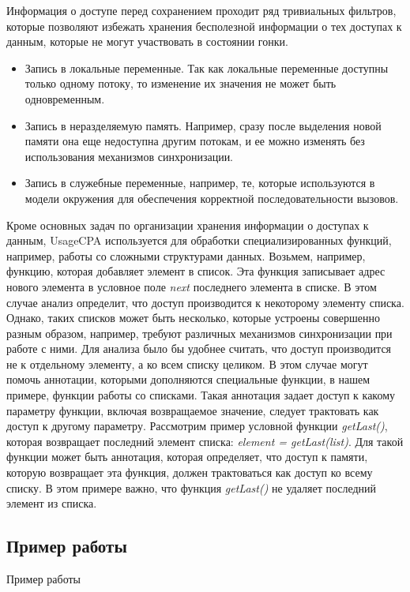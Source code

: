 Информация о доступе перед сохранением проходит ряд тривиальных фильтров, которые позволяют избежать хранения бесполезной информации о тех доступах к данным, которые не могут участвовать в состоянии гонки.

\begin{itemize}
\item Запись в локальные переменные. Так как локальные переменные доступны только одному потоку, то изменение их значения не может быть одновременным.
\item Запись в неразделяемую память. Например, сразу после выделения новой памяти она еще недоступна другим потокам, и ее можно изменять без использования механизмов синхронизации.
\item Запись в служебные переменные, например, те, которые используются в модели окружения для обеспечения корректной последовательности вызовов. 
\end{itemize}

Кроме основных задач по организации хранения информации о доступах к данным, UsageCPA используется для обработки специализированных функций, например, работы со сложными структурами данных.
Возьмем, например, функцию, которая добавляет элемент в список.
Эта функция записывает адрес нового элемента в условное поле \textit{next} последнего элемента в списке.
В этом случае анализ определит, что доступ производится к некоторому элементу списка.
Однако, таких списков может быть несколько, которые устроены совершенно разным образом, например, требуют различных механизмов синхронизации при работе с ними. 
Для анализа было бы удобнее считать, что доступ производится не к отдельному элементу, а ко всем списку целиком. 
В этом случае могут помочь аннотации, которыми дополняются специальные функции, в нашем примере, функции работы со списками.
Такая аннотация задает доступ к какому параметру функции, включая возвращаемое значение, следует трактовать как доступ к другому параметру.
Рассмотрим пример условной функции \textit{getLast()}, которая возвращает последний элемент списка: \textit{element = getLast(list)}.
Для такой функции может быть аннотация, которая определяет, что доступ к памяти, которую возвращает эта функция, должен трактоваться как доступ ко всему списку. 
В этом примере важно, что функция \textit{getLast()} не удаляет последний элемент из списка.


\subsection{Пример работы} \label{sect_impl_example}
Пример работы 

